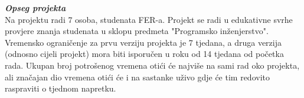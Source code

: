 		\textbf{\textit{Opseg projekta}}\\
		
		Na projektu radi 7 osoba, studenata FER-a. Projekt se radi u edukativne svrhe provjere znanja studenata u sklopu predmeta "Programsko inženjerstvo". Vremensko ograničenje za prvu verziju projekta je 7 tjedana, a druga verzija (odnosno cijeli projekt) mora biti isporučen u roku od 14 tjedana od početka rada. Ukupan broj potrošenog vremena otići će najviše na sami rad oko projekta, ali značajan dio vremena otići će i na sastanke uživo gdje će tim redovito raspraviti o tjednom napretku.
		
		\eject
		